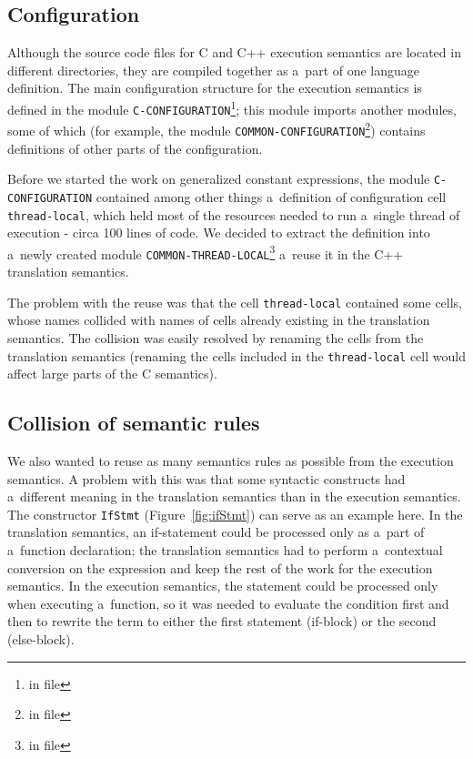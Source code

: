 \documentclass[nolot,nolof,nocover,printed]{fithesis3}
\begin{document}
\subsection{Configuration}


Although the source code files for C and C++ execution semantics are located in different directories, they are compiled together as a~part of one language definition. The main configuration structure for the execution semantics is defined in the module \lstinline|C-CONFIGURATION|\footnote{in file }; this module imports another modules, some of which (for example, the module \lstinline|COMMON-CONFIGURATION|\footnote{in file }) contains definitions of other parts of the configuration.


Before we started the work on generalized constant expressions, the module \lstinline|C-CONFIGURATION| contained among other things a~definition of configuration cell \lstinline|thread-local|, which held most of the resources needed to run a~single thread of execution - circa 100 lines of code. We decided to extract the definition into a~newly created module \lstinline|COMMON-THREAD-LOCAL|\footnote{in file } a~reuse it in the C++ translation semantics.

The problem with the reuse was that the cell \lstinline|thread-local| contained some cells, whose names collided with names of cells already existing in the translation semantics. The collision was easily resolved by renaming the cells from the translation semantics (renaming the cells included in the \lstinline|thread-local| cell would affect large parts of the C semantics).

\subsection{Collision of semantic rules}

We also wanted to reuse as many semantics rules as possible from the execution semantics. A problem with this was that some syntactic constructs had a~different meaning in the translation semantics than in the execution semantics. The constructor \lstinline|IfStmt| (Figure~\ref{fig:ifStmt}) can serve as an example here. In the translation semantics, an if-statement could be processed only as a~part of a~function declaration; the translation semantics had to perform a~contextual conversion on the expression and keep the rest of the work for the execution semantics. In the execution semantics, the statement could be processed only when executing a~function, so it was needed to evaluate the condition first and then to rewrite the term to either the first statement (if-block) or the second (else-block).
\end{document}
